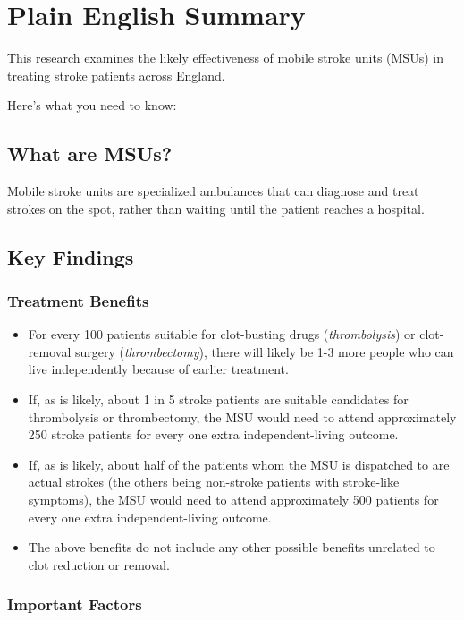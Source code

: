 \section*{Plain English Summary}

This research examines the likely effectiveness of mobile stroke units (MSUs) in treating stroke patients across England. 

Here's what you need to know:

\subsection*{What are MSUs?}
Mobile stroke units are specialized ambulances that can diagnose and treat strokes on the spot, rather than waiting until the patient reaches a hospital.

\subsection*{Key Findings}

\subsubsection*{Treatment Benefits}

\begin{itemize}
    \item For every 100 patients suitable for clot-busting drugs (\textit{thrombolysis}) or clot-removal surgery (\textit{thrombectomy}), there will likely be 1-3 more people who can live independently because of earlier treatment.
    \item If, as is likely, about 1 in 5 stroke patients are suitable candidates for thrombolysis or thrombectomy, the MSU would need to attend approximately 250 stroke patients for every one extra independent-living outcome.
    \item If, as is likely, about half of the patients whom the MSU is dispatched to are actual strokes (the others being non-stroke patients with stroke-like symptoms), the MSU would need to attend approximately 500 patients for every one extra independent-living outcome.
    \item The above benefits do not include any other possible benefits unrelated to clot reduction or removal.
\end{itemize}

\subsubsection*{Important Factors}

